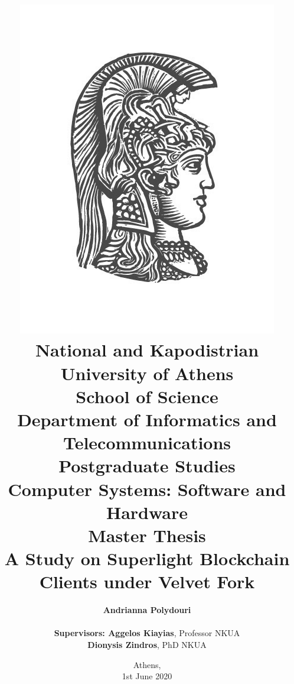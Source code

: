 \title{
    {\includegraphics[scale=0.8]{figures/logo_uoa.jpg}}\\
    {\large National and Kapodistrian University of Athens \\
    School of Science \\
    Department of Informatics and Telecommunications}\\
    \vspace{1cm}
    Postgraduate Studies \\
    Computer Systems: Software and Hardware\\
    \vspace{10mm}
    {Master Thesis}\\
    \vspace{3mm}
    {\textbf{\LARGE A Study on Superlight Blockchain Clients under Velvet Fork}}\\
    \vspace{1cm}
    }

\author{
    \textbf{Andrianna Polydouri} \\
    \vspace{1cm} \\
    \textbf{Supervisors: Aggelos Kiayias}, Professor NKUA\\
    \hspace{3.68cm}
    \textbf{Dionysis Zindros}, PhD NKUA
    \vspace{2cm}
}

\date{Athens, \\ 1st June 2020}